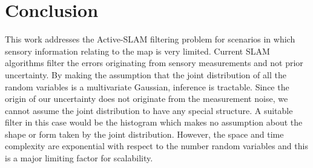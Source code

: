 \FloatBarrier
\section{Conclusion}\label{ch5:conclusion}

This work addresses the Active-SLAM filtering problem for scenarios in which sensory information relating to the map is very limited. Current
SLAM algorithms filter the errors originating from sensory measurements and not prior uncertainty. By making the assumption
that the joint distribution of all the random variables is a multivariate Gaussian, inference is tractable. Since the origin of 
our uncertainty does not originate from the measurement noise, we cannot assume the joint distribution to have any special structure. 
A suitable filter in this case would be the histogram which makes no assumption about the shape or form taken by the joint distribution. 
However, the space and time complexity are exponential with respect to the number random variables and this is a major 
limiting factor for scalability. 

